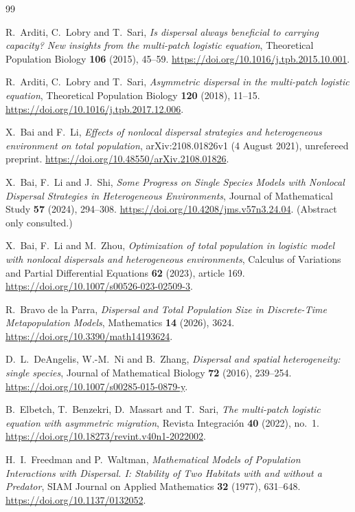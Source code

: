 \documentclass[11pt]{article}
\theoremstyle{remark}
\begin{document}
\begin{thebibliography}{99}

R.~Arditi, C.~Lobry and T.~Sari,
\emph{Is dispersal always beneficial to carrying capacity? New insights
from the multi-patch logistic equation},
Theoretical Population Biology \textbf{106} (2015), 45--59.
\url{https://doi.org/10.1016/j.tpb.2015.10.001}.

R.~Arditi, C.~Lobry and T.~Sari,
\emph{Asymmetric dispersal in the multi-patch logistic equation},
Theoretical Population Biology \textbf{120} (2018), 11--15.
\url{https://doi.org/10.1016/j.tpb.2017.12.006}.

X.~Bai and F.~Li,
\emph{Effects of nonlocal dispersal strategies and heterogeneous
environment on total population},
arXiv:2108.01826v1 (4 August 2021), unrefereed preprint.
\url{https://doi.org/10.48550/arXiv.2108.01826}.

X.~Bai, F.~Li and J.~Shi,
\emph{Some Progress on Single Species Models with Nonlocal Dispersal
Strategies in Heterogeneous Environments},
Journal of Mathematical Study \textbf{57} (2024), 294--308.
\url{https://doi.org/10.4208/jms.v57n3.24.04}.
(Abstract only consulted.)

X.~Bai, F.~Li and M.~Zhou,
\emph{Optimization of total population in logistic model with nonlocal
dispersals and heterogeneous environments},
Calculus of Variations and Partial Differential Equations
\textbf{62} (2023), article 169.
\url{https://doi.org/10.1007/s00526-023-02509-3}.

R.~Bravo de la Parra,
\emph{Dispersal and Total Population Size in Discrete-Time Metapopulation
Models},
Mathematics \textbf{14} (2026), 3624.
\url{https://doi.org/10.3390/math14193624}.

D.~L.~DeAngelis, W.-M.~Ni and B.~Zhang,
\emph{Dispersal and spatial heterogeneity: single species},
Journal of Mathematical Biology \textbf{72} (2016), 239--254.
\url{https://doi.org/10.1007/s00285-015-0879-y}.

B.~Elbetch, T.~Benzekri, D.~Massart and T.~Sari,
\emph{The multi-patch logistic equation with asymmetric migration},
Revista Integraci\'on \textbf{40} (2022), no.~1.
\url{https://doi.org/10.18273/revint.v40n1-2022002}.

H.~I.~Freedman and P.~Waltman,
\emph{Mathematical Models of Population Interactions with Dispersal. I:
Stability of Two Habitats with and without a Predator},
SIAM Journal on Applied Mathematics \textbf{32} (1977), 631--648.
\url{https://doi.org/10.1137/0132052}.


\end{thebibliography}
\end{document}
